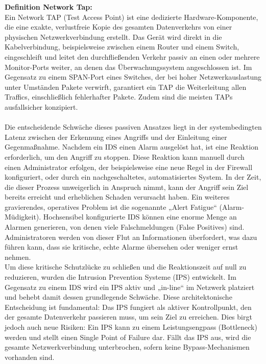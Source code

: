 \textbf{Definition Network Tap:}\\
Ein Network TAP (Test Access Point) ist eine dedizierte Hardware-Komponente, die eine exakte, verlustfreie Kopie des gesamten Datenverkehrs von einer physischen Netzwerkverbindung erstellt. Das Gerät wird direkt in die Kabelverbindung, beispielsweise zwischen einem Router und einem Switch, eingeschleift und leitet den durchfließenden Verkehr passiv an einen oder mehrere Monitor-Ports weiter, an denen das Überwachungssystem angeschlossen ist. Im Gegensatz zu einem SPAN-Port eines Switches, der bei hoher Netzwerkauslastung unter Umständen Pakete verwirft, garantiert ein TAP die Weiterleitung allen Traffics, einschließlich fehlerhafter Pakete. Zudem sind die meisten TAPs ausfallsicher konzipiert.\cite{TAP1}\\\\

Die entscheidende Schwäche dieses passiven Ansatzes liegt in der systembedingten Latenz zwischen der Erkennung eines Angriffs und der Einleitung einer Gegenmaßnahme. Nachdem ein IDS einen Alarm ausgelöst hat, ist eine Reaktion erforderlich, um den Angriff zu stoppen. Diese Reaktion kann manuell durch einen Administrator erfolgen, der beispielsweise eine neue Regel in der Firewall konfiguriert, oder durch ein nachgeschaltetes, automatisiertes System. In der Zeit, die dieser Prozess unweigerlich in Anspruch nimmt, kann der Angriff sein Ziel bereits erreicht und erheblichen Schaden verursacht haben. Ein weiteres gravierendes, operatives Problem ist die sogenannte „Alert Fatigue“ (Alarm-Müdigkeit). Hochsensibel konfigurierte IDS können eine enorme Menge an Alarmen generieren, von denen viele Falschmeldungen (False Positives) sind. Administratoren werden von dieser Flut an Informationen überfordert, was dazu führen kann, dass sie kritische, echte Alarme übersehen oder weniger ernst nehmen.\\

Um diese kritische Schutzlücke zu schließen und die Reaktionszeit auf null zu reduzieren, wurden die Intrusion Prevention Systeme (IPS) entwickelt. Im Gegensatz zu einem IDS wird ein IPS aktiv und „in-line“ im Netzwerk platziert und behebt damit dessen grundlegende Schwäche. Diese architektonische Entscheidung ist fundamental: Das IPS fungiert als aktiver Kontrollpunkt, den der gesamte Datenverkehr passieren muss, um sein Ziel zu erreichen. Dies birgt jedoch auch neue Risiken: Ein IPS kann zu einem Leistungsengpass (Bottleneck) werden und stellt einen Single Point of Failure dar. Fällt das IPS aus, wird die gesamte Netzwerkverbindung unterbrochen, sofern keine Bypass-Mechanismen vorhanden sind.\\

